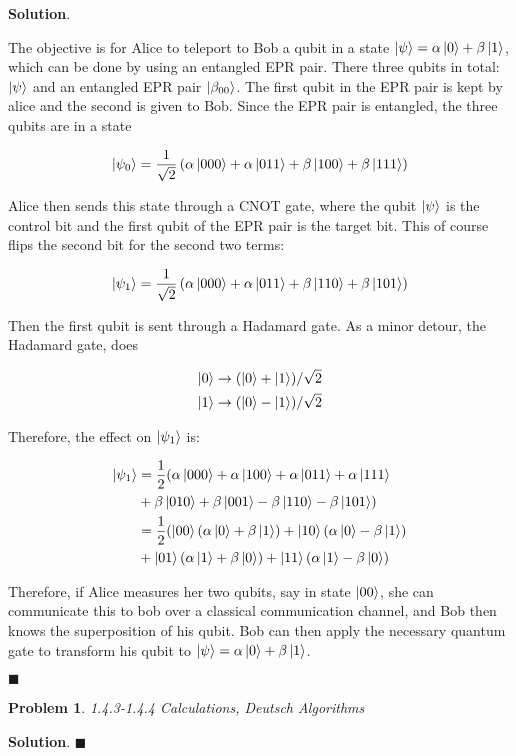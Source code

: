 \documentclass[12pt]{article}
\newtheorem{p}{Problem}
\theoremstyle{definition}
\newenvironment{s}{%
        \begin{trivlist} \item \textbf{Solution}. }{%
            \hspace*{\fill} $\blacksquare$\end{trivlist}}%
\begin{document}
{\begin{s}

The objective is for Alice to teleport to Bob a qubit in a state $\ket{\psi} = \alpha\ket{0} + \beta\ket{1}$, which can be done by using an entangled EPR pair. There three qubits in total: $\ket{\psi}$ and an entangled EPR pair $\ket{\beta_{00}}$. The first qubit in the EPR pair is kept by alice and the second is given to Bob. Since the EPR pair is entangled, the three qubits are in a state

\begin{equation*}
\ket{\psi_{0}} = \frac{1}{\sqrt{2}}\left(\alpha\ket{000} + \alpha\ket{011} + \beta\ket{100} + \beta\ket{111}\right)
\end{equation*}

Alice then sends this state through a CNOT gate, where the qubit $\ket{\psi}$ is the control bit and the first qubit of the EPR pair is the target bit. This of course flips the second bit for the second two terms:

\begin{equation*}
\ket{\psi_{1}} = \frac{1}{\sqrt{2}}\left(\alpha\ket{000} + \alpha\ket{011} + \beta\ket{110} + \beta\ket{101}\right)
\end{equation*}

Then the first qubit is sent through a Hadamard gate. As a minor detour, the Hadamard gate, does

\begin{align*}
\ket{0} &\rightarrow (\ket{0} + \ket{1})/\sqrt{2}\\
\ket{1} &\rightarrow (\ket{0} - \ket{1})/\sqrt{2}
\end{align*}

Therefore, the effect on $\ket{\psi_1}$ is:


\begin{align*}
\ket{\psi_{1}} &= \frac{1}{2}(\alpha\ket{000} + \alpha\ket{100} + \alpha\ket{011} + \alpha\ket{111}\\
&+ \beta\ket{010} + \beta\ket{001} - \beta\ket{110} - \beta\ket{101})\\
&= \frac{1}{2}(\ket{00}(\alpha\ket{0} + \beta\ket{1}) + \ket{10}(\alpha\ket{0} - \beta\ket{1})\\
&+ \ket{01}(\alpha\ket{1} + \beta\ket{0}) + \ket{11}(\alpha\ket{1} - \beta\ket{0})
\end{align*}

Therefore, if Alice measures her two qubits, say in state $\ket{00}$, she can communicate this to bob over a classical communication channel, and Bob then knows the superposition of his qubit. Bob can then apply the necessary quantum gate to transform his qubit to $\ket{\psi} = \alpha\ket{0} + \beta\ket{1}$.

\end{s}

\begin{p}
1.4.3-1.4.4 Calculations, Deutsch Algorithms
\end{p}

\begin{s}
\end{s}
\end{document}
